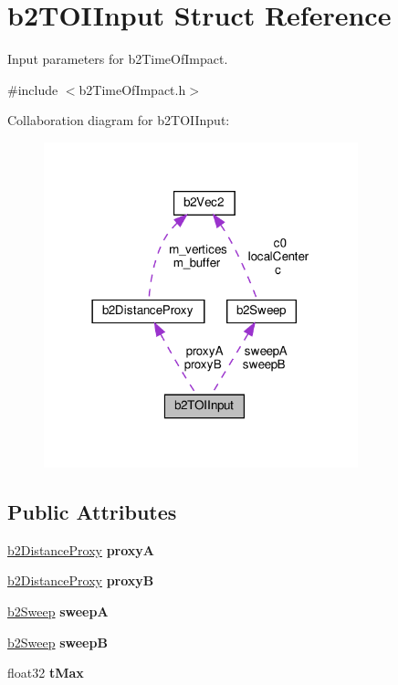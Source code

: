\hypertarget{structb2TOIInput}{}\section{b2\+T\+O\+I\+Input Struct Reference}
\label{structb2TOIInput}


Input parameters for b2\+Time\+Of\+Impact.  




{\ttfamily \#include $<$b2\+Time\+Of\+Impact.\+h$>$}



Collaboration diagram for b2\+T\+O\+I\+Input\+:
\nopagebreak
\begin{figure}[H]
\begin{center}
\leavevmode
\includegraphics[width=258pt]{structb2TOIInput__coll__graph}
\end{center}
\end{figure}
\subsection*{Public Attributes}
\begin{DoxyCompactItemize}
\item 
\mbox{\label{structb2TOIInput_a5c5fb931435d92ac2d2080552400cd57}} 
\hyperlink{structb2DistanceProxy}{b2\+Distance\+Proxy} {\bfseries proxyA}
\item 
\mbox{\label{structb2TOIInput_a7f4e614d1c574006402e9610c984a93f}} 
\hyperlink{structb2DistanceProxy}{b2\+Distance\+Proxy} {\bfseries proxyB}
\item 
\mbox{\label{structb2TOIInput_adf63a4b9969aa839c2d520bf6d76148a}} 
\hyperlink{structb2Sweep}{b2\+Sweep} {\bfseries sweepA}
\item 
\mbox{\label{structb2TOIInput_af506b6adc7eca852f08460ec76c7b9a7}} 
\hyperlink{structb2Sweep}{b2\+Sweep} {\bfseries sweepB}
\item 
\mbox{\label{structb2TOIInput_a365a434996de60957777a673918d3a5f}} 
float32 {\bfseries t\+Max}
\end{DoxyCompactItemize}


